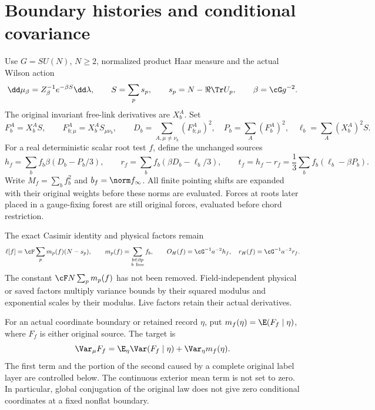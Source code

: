 \section{Boundary histories and conditional covariance}
\label{sec:r18setup}

Use $G=SU(N)$, $N\ge2$, normalized product Haar measure and the actual Wilson action
\begin{equation}
 \dd\mu_\beta=Z_\beta^{-1}e^{-\beta S}\dd\lambda,\qquad
 S=\sum_p s_p,\qquad s_p=N-\Re\Tr U_p,\qquad \beta=\cG g^{-2}.
 \label{eq:r18wilson}
\end{equation}
The original invariant free-link derivatives are $X_b^A$. Set
\[
 F_b^A=X_b^AS,\qquad
 F_{b;\mu}^A=X_b^AS_{\mu\nu_b},\qquad
 D_b=\sum_{A,\mu\ne\nu_b}(F_{b;\mu}^A)^2,\quad
 P_b=\sum_A(F_b^A)^2,\quad
 \ell_b=\sum_A(X_b^A)^2S.
\]
For a real deterministic scalar root test $f$, define the unchanged sources
\begin{equation}
 h_f=\sum_bf_b\beta(D_b-P_b/3),\qquad
 r_f=\sum_bf_b(\beta D_b-\ell_b/3),\qquad
 t_f=h_f-r_f=\frac13\sum_bf_b(\ell_b-\beta P_b).
 \label{eq:r18sources}
\end{equation}
Write $M_f=\sum_bf_b^2$ and $b_f=\norm f_\infty$. All finite pointing shifts are expanded with their original weights before these norms are evaluated. Forces at roots later placed in a gauge-fixing forest are still original forces, evaluated before chord restriction.

The exact Casimir identity and physical factors remain
\begin{equation}
 \ell[f]=\cF\sum_pm_p(f)(N-s_p),\qquad
 m_p(f)=\sum_{\substack{b\in\partial p\\b\ {\rm free}}}f_b,
 \qquad
 O_H(f)=\cG^{-1}a^{-2}h_f,\quad r_H(f)=\cG^{-1}a^{-2}r_f.
 \label{eq:r18physical}
\end{equation}
The constant $\cF N\sum_pm_p(f)$ has not been removed. Field-independent physical or saved factors multiply variance bounds by their squared modulus and exponential scales by their modulus. Live factors retain their actual derivatives.

For an actual coordinate boundary or retained record $\eta$, put $m_f(\eta)=\E(F_f\mid\eta)$, where $F_f$ is either original source. The target is
\begin{equation}
 \Var_\mu F_f
 =\E_\eta\Var(F_f\mid\eta)+\Var_\eta m_f(\eta).
 \label{eq:r18variance}
\end{equation}
The first term and the portion of the second caused by a complete original label layer are controlled below. The continuous exterior mean term is not set to zero. In particular, global conjugation of the original law does not give zero conditional coordinates at a fixed nonflat boundary.
